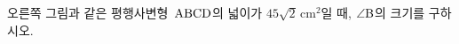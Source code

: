 \noindent\begin{minipage}[t]{0.58\linewidth}\vspace{0pt}\raggedright 오른쪽 그림과 같은 평행사변형~$\mathrm{ABCD}$의 넓이가 $45\sqrt{2}\,\mathrm{cm}^2$일 때, $\angle\mathrm{B}$의 크기를 구하시오. \end{minipage}\hfill\begin{minipage}[t]{0.4\linewidth}\vspace{0pt}\centering \resizebox{\ifdim\width>\linewidth\linewidth\else\width\fi}{!}{}\end{minipage}\par
